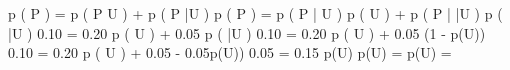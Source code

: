 \documentclass[11pt]{article}
\begin{document}
    \begin{1.4.1}
        p ( P ) = p ( P \cap U ) + p ( P \cap \bar U )
        p ( P ) = p ( P | U ) p ( U ) + p ( P | \bar U ) p ( \bar U )
        0.10 = 0.20 p ( U ) + 0.05 p ( \bar U )
        0.10 = 0.20 p ( U ) + 0.05 (1 - p(U))
        0.10 = 0.20 p ( U ) + 0.05 - 0.05p(U))
        0.05 = 0.15 p(U)
        p(U) = 
        p(U) = 
    \end{1.4.1}
\end{document}
